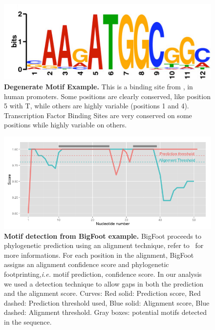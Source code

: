 \documentclass[10pt]{article}
\begin{document}
\begin{figure}[!ht]
\begin{center}
\includegraphics{Figures/DegenerateMotif.png}
\end{center}
\caption{
{\bf Degenerate Motif Example.}  This is a binding site from \citealt{whitfield_functional_2012}, in human promoters. Some positions are clearly conserved, like position 5 with T, while others are highly variable (positions 1 and 4). Transcription Factor Binding Sites are very conserved on some positions while highly variable on others.
}
\label{fig:DegenerateMotif}
\end{figure}

\begin{figure}[!ht]
\begin{center}
\includegraphics[scale=0.6]{Figures/ScoresPlot.png}
\end{center}
\caption{
{\bf Motif detection from BigFoot example.} BigFoot proceeds to phylogenetic prediction using an alignment technique, refer to~\citep{satija_bigfoot:_2009} for more informations. For each position in the alignment, BigFoot assigns an alignment confidence score and phylogenetic footprinting,\textit{i.e.} motif prediction, confidence score. In our analysis we used a detection technique to allow gaps in both the prediction and the alignment score. Curves: Red solid: Prediction score, Red dashed: Prediction threshold used, Blue solid: Alignment score, Blue dashed: Alignment threshold. Gray boxes: potential motifs detected in the sequence.
}
\label{fig:Scores}
\end{figure}
\end{document}
